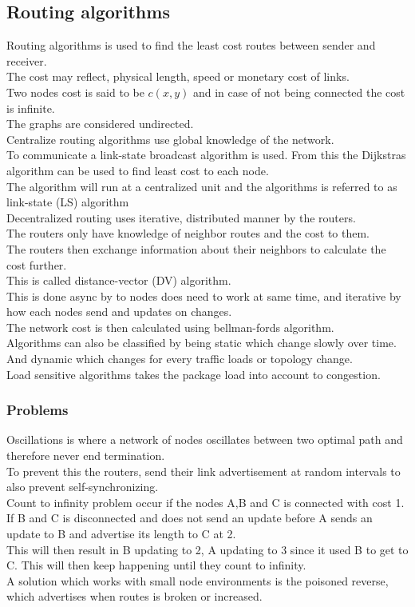 \documentclass[12pt, a4paper]{article}
\begin{document}
		\subsection{Routing algorithms}
			Routing algorithms is used to find the least cost routes between sender and receiver.\\
			The cost may reflect, physical length, speed or monetary cost of links.\\
			Two nodes cost is said to be $c(x,y)$ and in case of not being connected the cost is infinite.\\
			The graphs are considered undirected.\\
			Centralize routing algorithms use global knowledge of the network.\\
			To communicate a link-state broadcast algorithm is used. From this the Dijkstras algorithm can be used to find least cost to each node.\\[4mm]
			The algorithm will run at a centralized unit and the algorithms is referred to as link-state (LS) algorithm\\
			Decentralized routing uses iterative, distributed manner by the routers.\\
			The routers only have knowledge of neighbor routes and the cost to them.\\
			The routers then exchange information about their neighbors to calculate the cost further.\\
			This is called distance-vector (DV) algorithm.\\
			This is done async by to nodes does need to work at same time, and iterative by how each nodes send and updates on changes.\\
			The network cost is then calculated using bellman-fords algorithm.\\[4mm]
			Algorithms can also be classified by being static which change slowly over time.\\
			And dynamic which changes for every traffic loads or topology change.\\
			Load sensitive algorithms takes the package load into account to congestion.\\
			\subsubsection{Problems}
				Oscillations is where a network of nodes oscillates between two optimal path and therefore never end termination.\\
				To prevent this the routers, send their link advertisement at random intervals to also prevent self-synchronizing.\\
				Count to infinity problem occur if the nodes A,B and C is connected with cost 1.\\
				If B and C is disconnected and does not send an update before A sends an update to B and advertise its length to C at 2.\\
				This will then result in B updating to 2, A updating to 3 since it used B to get to C. This will then keep happening until they count to infinity.\\
				A solution which works with small node environments is the poisoned reverse, which advertises when routes is broken or increased.
\end{document}
